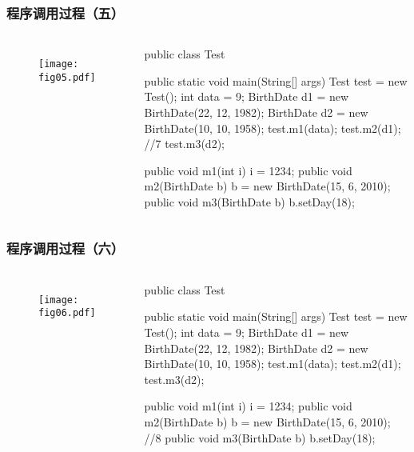 \begin{frame}[fragile] %
\frametitle{程序调用过程（五）}

\begin{columns}
\begin{figure}
\centering
\texttt{[image: fig05.pdf]}
\end{figure}

\begin{javaCode}\small
public class Test {
  public static void main(String[] args) {
    Test test = new Test(); 
    int data = 9; 
    BirthDate d1 = new BirthDate(22, 12, 1982); 
    BirthDate d2 = new BirthDate(10, 10, 1958); 
    test.m1(data); 
    test.m2(d1); //7
    test.m3(d2);
  }

  public void m1(int i) {
    i = 1234; 
  }
  public void m2(BirthDate b) { 
    b = new BirthDate(15, 6, 2010);
  }
  public void m3(BirthDate b) {
    b.setDay(18);
  }
}
\end{javaCode}
\end{columns}
\end{frame}



\begin{frame}[fragile] %
\frametitle{程序调用过程（六）}

\begin{columns}
\begin{figure}
\centering
\texttt{[image: fig06.pdf]}
\end{figure}

\begin{javaCode}\small
public class Test {
  public static void main(String[] args) {
    Test test = new Test(); 
    int data = 9; 
    BirthDate d1 = new BirthDate(22, 12, 1982); 
    BirthDate d2 = new BirthDate(10, 10, 1958); 
    test.m1(data); 
    test.m2(d1); 
    test.m3(d2);
  }

  public void m1(int i) {
    i = 1234; 
  }
  public void m2(BirthDate b) { 
    b = new BirthDate(15, 6, 2010); //8
  }
  public void m3(BirthDate b) {
    b.setDay(18);
  }
}
\end{javaCode}
\end{columns}
\end{frame}

